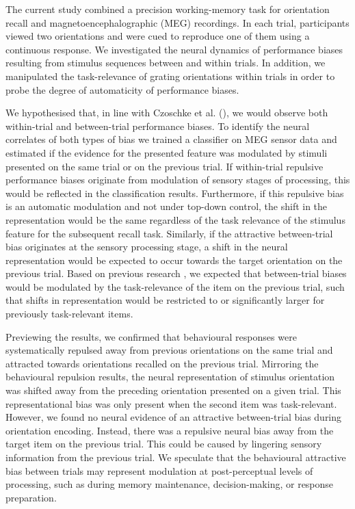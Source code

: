 \documentclass{article}
\begin{document}
\begin{large}
The current study combined a precision working-memory task for orientation recall and magnetoencephalographic (MEG) recordings. In each trial, participants viewed two orientations and were cued to reproduce one of them using a continuous response. We investigated the neural dynamics of performance biases resulting from stimulus sequences between and within trials. In addition, we manipulated the task-relevance of grating orientations within trials in order to probe the degree of automaticity of performance biases.

We hypothesised that, in line with Czoschke et al. (\citeyear{Czoschke2019}), we would observe both within-trial and between-trial performance biases. To identify the neural correlates of both types of bias we trained a classifier on MEG sensor data and estimated if the evidence for the presented feature was modulated by stimuli presented on the same trial or on the previous trial. If within-trial repulsive performance biases originate from modulation of sensory stages of processing, this would be reflected in the classification results. Furthermore, if this repulsive bias is an automatic modulation and not under top-down control, the shift in the representation would be the same regardless of the task relevance of the stimulus feature for the subsequent recall task. Similarly, if the attractive between-trial bias originates at the sensory processing stage, a shift in the neural representation would be expected to occur towards the target orientation on the previous trial. Based on previous research \parencite{Bae2020, Fischer2020}, we expected that between-trial biases would be modulated by the task-relevance of the item on the previous trial, such that shifts in representation would be restricted to or significantly larger for previously task-relevant items.

Previewing the results, we confirmed that behavioural responses were systematically repulsed away from previous orientations on the same trial and attracted towards orientations recalled on the previous trial. Mirroring the behavioural repulsion results, the neural representation of stimulus orientation was shifted away from the preceding orientation presented on a given trial. This representational bias was only present when the second item was task-relevant. However, we found no neural evidence of an attractive between-trial bias during orientation encoding. Instead, there was a repulsive neural bias away from the target item on the previous trial. This could be caused by lingering sensory information from the previous trial. We speculate that the behavioural attractive bias between trials may represent modulation at post-perceptual levels of processing, such as during memory maintenance, decision-making, or response preparation.


\end{large}
\end{document}
